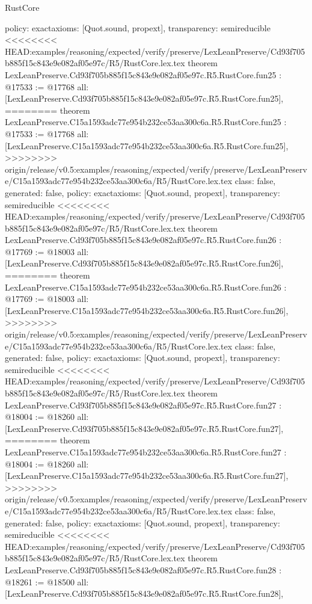 \begin{lexlean}{RustCore}
\begin{coremodule}
{\begin{coremodule}
{{{{{{{{{{{{{{{{{{{{{{{{{{{{  policy: exact{axioms: [Quot.sound, propext]},
  transparency: semireducible
}
<<<<<<<< HEAD:examples/reasoning/expected/verify/preserve/LexLeanPreserve/Cd93f705b885f15c843e9e082af05e97c/R5/RustCore.lex.tex
theorem LexLeanPreserve.Cd93f705b885f15c843e9e082af05e97c.R5.RustCore.fun25 : @17533 := @17768 {
  all: [LexLeanPreserve.Cd93f705b885f15c843e9e082af05e97c.R5.RustCore.fun25],
========
theorem LexLeanPreserve.C15a1593adc77e954b232ce53aa300c6a.R5.RustCore.fun25 : @17533 := @17768 {
  all: [LexLeanPreserve.C15a1593adc77e954b232ce53aa300c6a.R5.RustCore.fun25],
>>>>>>>> origin/release/v0.5:examples/reasoning/expected/verify/preserve/LexLeanPreserve/C15a1593adc77e954b232ce53aa300c6a/R5/RustCore.lex.tex
  class: false,
  generated: false,
  policy: exact{axioms: [Quot.sound, propext]},
  transparency: semireducible
}
<<<<<<<< HEAD:examples/reasoning/expected/verify/preserve/LexLeanPreserve/Cd93f705b885f15c843e9e082af05e97c/R5/RustCore.lex.tex
theorem LexLeanPreserve.Cd93f705b885f15c843e9e082af05e97c.R5.RustCore.fun26 : @17769 := @18003 {
  all: [LexLeanPreserve.Cd93f705b885f15c843e9e082af05e97c.R5.RustCore.fun26],
========
theorem LexLeanPreserve.C15a1593adc77e954b232ce53aa300c6a.R5.RustCore.fun26 : @17769 := @18003 {
  all: [LexLeanPreserve.C15a1593adc77e954b232ce53aa300c6a.R5.RustCore.fun26],
>>>>>>>> origin/release/v0.5:examples/reasoning/expected/verify/preserve/LexLeanPreserve/C15a1593adc77e954b232ce53aa300c6a/R5/RustCore.lex.tex
  class: false,
  generated: false,
  policy: exact{axioms: [Quot.sound, propext]},
  transparency: semireducible
}
<<<<<<<< HEAD:examples/reasoning/expected/verify/preserve/LexLeanPreserve/Cd93f705b885f15c843e9e082af05e97c/R5/RustCore.lex.tex
theorem LexLeanPreserve.Cd93f705b885f15c843e9e082af05e97c.R5.RustCore.fun27 : @18004 := @18260 {
  all: [LexLeanPreserve.Cd93f705b885f15c843e9e082af05e97c.R5.RustCore.fun27],
========
theorem LexLeanPreserve.C15a1593adc77e954b232ce53aa300c6a.R5.RustCore.fun27 : @18004 := @18260 {
  all: [LexLeanPreserve.C15a1593adc77e954b232ce53aa300c6a.R5.RustCore.fun27],
>>>>>>>> origin/release/v0.5:examples/reasoning/expected/verify/preserve/LexLeanPreserve/C15a1593adc77e954b232ce53aa300c6a/R5/RustCore.lex.tex
  class: false,
  generated: false,
  policy: exact{axioms: [Quot.sound, propext]},
  transparency: semireducible
}
<<<<<<<< HEAD:examples/reasoning/expected/verify/preserve/LexLeanPreserve/Cd93f705b885f15c843e9e082af05e97c/R5/RustCore.lex.tex
theorem LexLeanPreserve.Cd93f705b885f15c843e9e082af05e97c.R5.RustCore.fun28 : @18261 := @18500 {
  all: [LexLeanPreserve.Cd93f705b885f15c843e9e082af05e97c.R5.RustCore.fun28],
}}}}}}}}}}}}}}}}}}}}}}}}}}}}}}}
\end{coremodule}}
\end{coremodule}
\end{lexlean}
